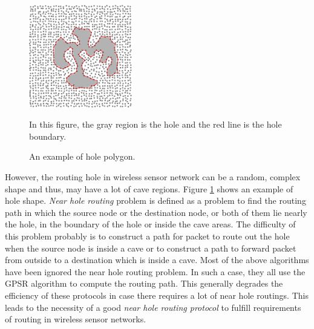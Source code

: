 \begin{figure}[!htb]
\centering
\includegraphics[width=0.4\textwidth]{Chapter2/Chapter2Figs/fig-polygon.eps}
\caption{An example of hole polygon.}
\centering
\small {In this figure, the gray region is the hole and the red line is the hole boundary.}
\label{cave-regions}
\end{figure}

However, the routing hole in wireless sensor network can be a random, complex shape and thus, may have a lot of cave regions. Figure \ref{cave-regions} shows an example of hole shape. \emph{Near hole routing} problem is defined as a problem to find the routing path in which the source node or the destination node, or both of them lie nearly the hole, in the boundary of the hole or inside the cave areas. The difficulty of this problem probably is to construct a path for packet to route out the hole when the source node is inside a cave or to construct a path to forward packet from outside to a destination which is inside a cave. Most of the above algorithms have been ignored the near hole routing problem. In such a case, they all use the GPSR algorithm to compute the routing path. This generally degrades the efficiency of these protocols in case there requires a lot of near hole routings. This leads to the necessity of a good \emph{near hole routing protocol} to fulfill requirements of routing in wireless sensor networks.

